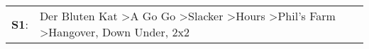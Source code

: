 \begin{supertabular}{p{0.03\textwidth}p{0.92\textwidth}}
 \textbf{S1}:  &  Der Bluten Kat\textsuperscript{} \textgreater \enspace A Go Go\textsuperscript{} \textgreater \enspace Slacker\textsuperscript{} \textgreater \enspace Hours\textsuperscript{} \textgreater \enspace Phil's Farm\textsuperscript{} \textgreater \enspace Hangover\textsuperscript{}, \enspace Down Under\textsuperscript{}, \enspace 2x2\textsuperscript{}  \enspace  \\
\end{supertabular}
